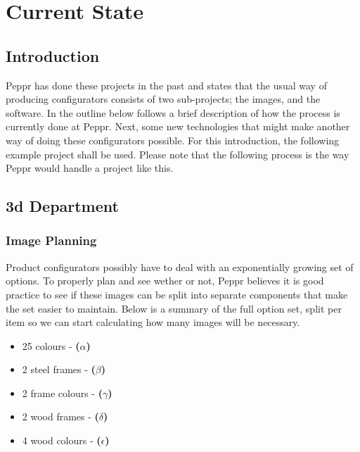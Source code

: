 \newpage
\chapter{Current State}
\section{Introduction}


Peppr has done these projects in the past and states that the usual way of producing configurators consists of two sub-projects; the images, and the software. In the outline below follows a brief description of how the process is currently done at Peppr. Next, some new technologies that might make another way of doing these configurators possible.
For this introduction, the following example project shall be used. Please note that the following process is the way Peppr would handle a project like this.
\newline
{}


\section{3d Department}
\subsection{Image Planning}
Product configurators possibly have to deal with an exponentially growing set of options. To properly plan and see wether or not, Peppr believes it is good practice to see if these images can be split into separate components that make the set easier to maintain. Below is a summary of the full option set, split per item so we can start calculating how many images will be necessary.
\begin{itemize}
	\item 25 colours - \textbf{(\( \alpha \))}
	\item 2 steel frames - \textbf{(\( \beta \))}
	\item 2 frame colours - \textbf{(\( \gamma \))}
	\item 2 wood frames - \textbf{(\( \delta \))}
	\item 4 wood colours - \textbf{(\( \epsilon \))}
\end{itemize}

